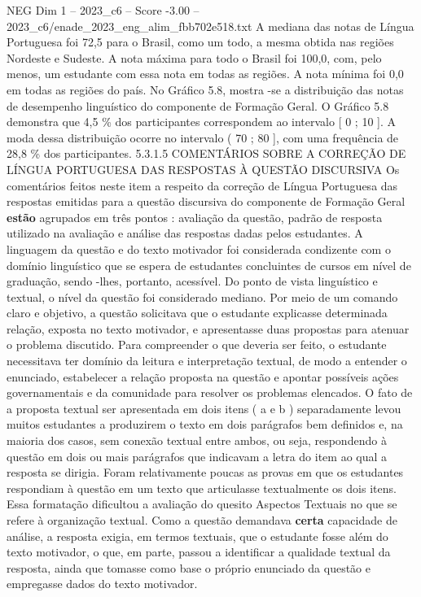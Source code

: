 \begin{textsample}{NEG Dim 1 – 2023\_c6 – Score -3.00 – 2023\_c6/enade\_2023\_eng\_alim\_fbb702e518.txt}
A mediana das notas de Língua Portuguesa foi 72,5 para o Brasil, como um todo, a mesma obtida nas regiões Nordeste e Sudeste.
A nota máxima para todo o Brasil foi 100,0, com, pelo menos, um estudante com essa nota em todas as regiões.
A nota mínima foi 0,0 em todas as regiões do país.
No Gráfico 5.8, mostra -se a distribuição das notas de desempenho linguístico do componente de Formação Geral.
O Gráfico 5.8 demonstra que 4,5 \% dos participantes correspondem ao intervalo [ 0 ; 10 ].
A moda dessa distribuição ocorre no intervalo ( 70 ; 80 ], com uma frequência de 28,8 \% dos participantes. 5.3.1.5 COMENTÁRIOS SOBRE A CORREÇÃO DE LÍNGUA PORTUGUESA DAS RESPOSTAS À QUESTÃO DISCURSIVA Os comentários feitos neste item a respeito da correção de Língua Portuguesa das respostas emitidas para a questão discursiva do componente de Formação Geral \textbf{estão} agrupados em três pontos : avaliação da questão, padrão de resposta utilizado na avaliação e análise das respostas dadas pelos estudantes.
A linguagem da questão e do texto motivador foi considerada condizente com o domínio linguístico que se espera de estudantes concluintes de cursos em nível de graduação, sendo -lhes, portanto, acessível.
Do ponto de vista linguístico e textual, o nível da questão foi considerado mediano.
Por meio de um comando claro e objetivo, a questão solicitava que o estudante explicasse determinada relação, exposta no texto motivador, e apresentasse duas propostas para atenuar o problema discutido.
Para compreender o que deveria ser feito, o estudante necessitava ter domínio da leitura e interpretação textual, de modo a entender o enunciado, estabelecer a relação proposta na questão e apontar possíveis ações governamentais e da comunidade para resolver os problemas elencados.
O fato de a proposta textual ser apresentada em dois itens ( a e b ) separadamente levou muitos estudantes a produzirem o texto em dois parágrafos bem definidos e, na maioria dos casos, sem conexão textual entre ambos, ou seja, respondendo à questão em dois ou mais parágrafos que indicavam a letra do item ao qual a resposta se dirigia.
Foram relativamente poucas as provas em que os estudantes respondiam à questão em um texto que articulasse textualmente os dois itens.
Essa formatação dificultou a avaliação do quesito Aspectos Textuais no que se refere à organização textual.
Como a questão demandava \textbf{certa} capacidade de análise, a resposta exigia, em termos textuais, que o estudante fosse além do texto motivador, o que, em parte, passou a identificar a qualidade textual da resposta, ainda que tomasse como base o próprio enunciado da questão e empregasse dados do texto motivador.

\end{textsample}

